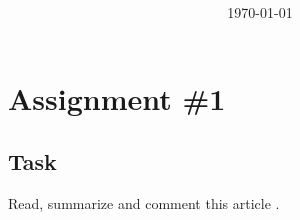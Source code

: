 \documentclass{article}
\title{
	\vspace{2in}
	\textmd{\textbf{\asgmTitle}}\\
	\vspace{0.1in}\large{\textbf{\asgmClass}}\\
	\vspace{0.1in}\large{\textit{\asgmInstructor}}\\
	\vspace{3in}
}
\author{\vspace{0.1in}\textbf{\asgmAuther}\\ \textbf{\StudentID}}
\date{\today}
\begin{document}
\maketitle
\thispagestyle{empty}

\pagebreak
\setcounter{page}{0}
\thispagestyle{empty}
\tableofcontents



\pagebreak
\setcounter{page}{1}
\section*{Assignment \#1}
\subsection*{Task}
Read, summarize and comment this article \cite{almeida2012good}.
\end{document}
